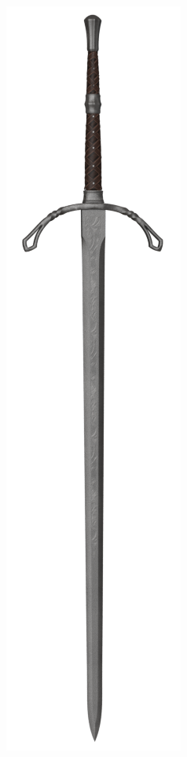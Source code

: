 \begin{figure}[h]
\begin{center}
\includegraphics[scale=0.2]{img/Longsword.png}
\end{center}
\end{figure}

